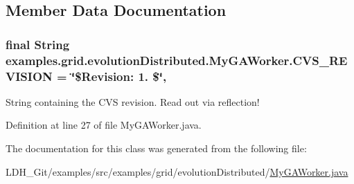 \subsection{Member Data Documentation}
\hypertarget{classexamples_1_1grid_1_1evolution_distributed_1_1_my_g_a_worker_af519c7a4d616360bbd1aa7c565b81066}{
\subsubsection[{C\-V\-S\-\_\-\-R\-E\-V\-I\-S\-I\-O\-N}]{\setlength{\rightskip}{0pt plus 5cm}final String examples.\-grid.\-evolution\-Distributed.\-My\-G\-A\-Worker.\-C\-V\-S\-\_\-\-R\-E\-V\-I\-S\-I\-O\-N = \char`\"{}\$Revision\-: 1. \$\char`\"{}\hspace{0.3cm}{\ttfamily [static]}, {\ttfamily [private]}}}\label{classexamples_1_1grid_1_1evolution_distributed_1_1_my_g_a_worker_af519c7a4d616360bbd1aa7c565b81066}
String containing the C\-V\-S revision. Read out via reflection! 

Definition at line 27 of file My\-G\-A\-Worker.\-java.



The documentation for this class was generated from the following file\-:\begin{DoxyCompactItemize}
\item 
L\-D\-H\-\_\-\-Git/examples/src/examples/grid/evolution\-Distributed/\hyperlink{evolution_distributed_2_my_g_a_worker_8java}{My\-G\-A\-Worker.\-java}\end{DoxyCompactItemize}
